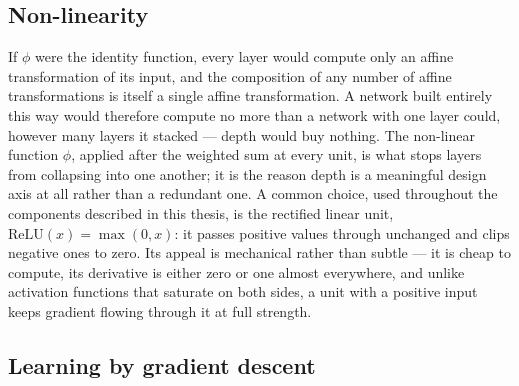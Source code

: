 \subsection{Non-linearity}
\label{sec:non-linearity}

If $\phi$ were the identity function, every layer would compute only an affine transformation of its input, and the composition of any number of affine transformations is itself a single affine transformation. A network built entirely this way would therefore compute no more than a network with one layer could, however many layers it stacked --- depth would buy nothing. The non-linear function $\phi$, applied after the weighted sum at every unit, is what stops layers from collapsing into one another; it is the reason depth is a meaningful design axis at all rather than a redundant one. A common choice, used throughout the components described in this thesis, is the rectified linear unit, $\text{ReLU}(x) = \max(0, x)$: it passes positive values through unchanged and clips negative ones to zero. Its appeal is mechanical rather than subtle --- it is cheap to compute, its derivative is either zero or one almost everywhere, and unlike activation functions that saturate on both sides, a unit with a positive input keeps gradient flowing through it at full strength.

\subsection{Learning by gradient descent}
\label{sec:gradient-descent}

